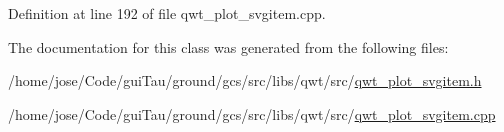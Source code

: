Definition at line 192 of file qwt\-\_\-plot\-\_\-svgitem.\-cpp.



The documentation for this class was generated from the following files\-:\begin{DoxyCompactItemize}
\item 
/home/jose/\-Code/gui\-Tau/ground/gcs/src/libs/qwt/src/\hyperlink{qwt__plot__svgitem_8h}{qwt\-\_\-plot\-\_\-svgitem.\-h}\item 
/home/jose/\-Code/gui\-Tau/ground/gcs/src/libs/qwt/src/\hyperlink{qwt__plot__svgitem_8cpp}{qwt\-\_\-plot\-\_\-svgitem.\-cpp}\end{DoxyCompactItemize}
